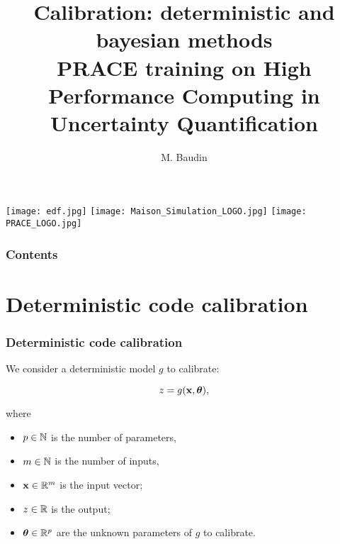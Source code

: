 \documentclass{beamer}
\title[PRACE/UQ: Calibration]{
Calibration: deterministic and bayesian methods \\
PRACE training on High Performance Computing in Uncertainty Quantification 
}
\author[Baudin]{
M. Baudin
}
\begin{document}

  \begin{frame}
  \titlepage
  
\begin{center}
\texttt{[image: edf.jpg]}
\hspace{1cm}
\texttt{[image: Maison\_Simulation\_LOGO.jpg]}
\hspace{1cm}
\texttt{[image: PRACE\_LOGO.jpg]}
\end{center}

  \end{frame}


\begin{frame}
\frametitle{Contents}
\tableofcontents
\end{frame}

\section{Deterministic code calibration}


\begin{frame}
\frametitle{Deterministic code calibration}

We consider a deterministic model $g$ to calibrate:

$$
z = g({\bf x}, \boldsymbol{\theta}),
$$

where

\begin{itemize}
\item $p \in\mathbb{N}$ is the number of parameters, 
\item $m \in\mathbb{N}$ is the number of inputs, 
\item ${\bf x} \in \mathbb{R}^{m}$ is the input vector;
\item $z \in \mathbb{R}$ is the output;
\item $\boldsymbol{\theta} \in \mathbb{R}^p$ are the unknown parameters of 
      $g$ to calibrate.
\end{itemize}

\end{frame}

\end{document}
